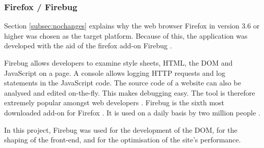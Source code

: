 \subsubsection{Firefox / Firebug}

Section \ref{subsec:nochanges} explains why the web browser Firefox \cite{firefox} in version 3.6 or higher was chosen as the target platform. Because of this, the application was developed with the aid of the firefox add-on Firebug \cite{firebug}.

Firebug allows developers to examine style sheets, HTML, the DOM and JavaScript on a page. A console allows logging HTTP requests and log statements in the JavaScript code. The source code of a website can also be analysed and edited on-the-fly. This makes debugging easy. The tool is therefore extremely popular amongst web developers \cite{firebug:beliebt}. Firebug is the sixth most downloaded add-on for Firefox \cite{firebug:haeufig}. It is used on a daily basis by two million people \cite{firebug:stats}.

In this project, Firebug was used for the development of the DOM, for the shaping of the front-end, and for the optimisation of the site's performance.